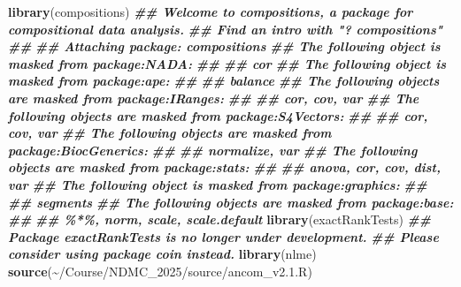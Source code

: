 \documentclass[
]{article}
\newenvironment{Shaded}{\begin{snugshade}}{\end{snugshade}}
\newcommand{\DocumentationTok}[1]{\textcolor[rgb]{0.56,0.35,0.01}{\textbf{\textit{#1}}}}
\newcommand{\FunctionTok}[1]{\textcolor[rgb]{0.13,0.29,0.53}{\textbf{#1}}}
\newcommand{\NormalTok}[1]{#1}
\newcommand{\StringTok}[1]{\textcolor[rgb]{0.31,0.60,0.02}{#1}}
\begin{document}
\begin{Shaded}
\begin{Highlighting}[]
\FunctionTok{library}\NormalTok{(compositions)}
\DocumentationTok{\#\# Welcome to compositions, a package for compositional data analysis.}
\DocumentationTok{\#\# Find an intro with "? compositions"}
\DocumentationTok{\#\# }
\DocumentationTok{\#\# Attaching package: \textquotesingle{}compositions\textquotesingle{}}
\DocumentationTok{\#\# The following object is masked from \textquotesingle{}package:NADA\textquotesingle{}:}
\DocumentationTok{\#\# }
\DocumentationTok{\#\#     cor}
\DocumentationTok{\#\# The following object is masked from \textquotesingle{}package:ape\textquotesingle{}:}
\DocumentationTok{\#\# }
\DocumentationTok{\#\#     balance}
\DocumentationTok{\#\# The following objects are masked from \textquotesingle{}package:IRanges\textquotesingle{}:}
\DocumentationTok{\#\# }
\DocumentationTok{\#\#     cor, cov, var}
\DocumentationTok{\#\# The following objects are masked from \textquotesingle{}package:S4Vectors\textquotesingle{}:}
\DocumentationTok{\#\# }
\DocumentationTok{\#\#     cor, cov, var}
\DocumentationTok{\#\# The following objects are masked from \textquotesingle{}package:BiocGenerics\textquotesingle{}:}
\DocumentationTok{\#\# }
\DocumentationTok{\#\#     normalize, var}
\DocumentationTok{\#\# The following objects are masked from \textquotesingle{}package:stats\textquotesingle{}:}
\DocumentationTok{\#\# }
\DocumentationTok{\#\#     anova, cor, cov, dist, var}
\DocumentationTok{\#\# The following object is masked from \textquotesingle{}package:graphics\textquotesingle{}:}
\DocumentationTok{\#\# }
\DocumentationTok{\#\#     segments}
\DocumentationTok{\#\# The following objects are masked from \textquotesingle{}package:base\textquotesingle{}:}
\DocumentationTok{\#\# }
\DocumentationTok{\#\#     \%*\%, norm, scale, scale.default}
\FunctionTok{library}\NormalTok{(exactRankTests)}
\DocumentationTok{\#\#  Package \textquotesingle{}exactRankTests\textquotesingle{} is no longer under development.}
\DocumentationTok{\#\#  Please consider using package \textquotesingle{}coin\textquotesingle{} instead.}
\FunctionTok{library}\NormalTok{(nlme)}
\FunctionTok{source}\NormalTok{(}\StringTok{\textquotesingle{}\textasciitilde{}/Course/NDMC\_2025/source/ancom\_v2.1.R\textquotesingle{}}\NormalTok{)}


\end{Highlighting}
\end{Shaded}
\end{document}
